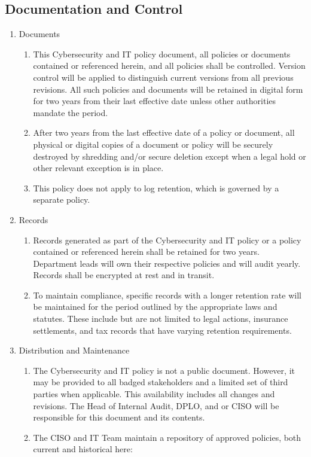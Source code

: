 \documentclass[../main.tex]{subfiles}
\begin{document}
  \subsection{Documentation and Control}
  \begin{enumerate}
    \item Documents
    \begin{enumerate}
        \item This Cybersecurity and IT policy document, all policies or documents contained or referenced herein, and all \CompanyName policies shall be controlled. Version control will
        be applied to distinguish current versions from all previous revisions. All such policies and documents will be retained in digital form for two years from their last effective date
        unless other authorities mandate the period.
        \item After two years from the last effective date of a policy or document, all physical or digital copies of a document or policy will be securely destroyed by shredding and/or secure
        deletion except when a legal hold or other relevant exception is in place.
        \item This policy does not apply to log retention, which is governed by a separate policy.
      \end{enumerate}
  \item{Records}
  \begin{enumerate}
    \item Records generated as part of the Cybersecurity and IT policy or a policy contained or referenced herein shall be retained for two years. Department leads will own their respective
    policies and will audit yearly. Records shall be encrypted at rest and in transit.
    \item To maintain compliance, specific records with a longer retention rate will be maintained for the period outlined by the appropriate laws and statutes. These include but are not
    limited to legal actions, insurance settlements, and tax records that have varying retention requirements.
  \end{enumerate}
  \item{Distribution and Maintenance}
  \begin{enumerate}
    \item The Cybersecurity and IT policy is not a public document. However, it may be provided to all badged stakeholders and a limited set of third parties when applicable.
    This availability includes all changes and revisions. The Head of Internal Audit, DPLO, and or CISO will be responsible for this document and its contents.
    \item The CISO and IT Team maintain a repository of approved policies, both current and historical here: \DocumentationandPolicies
  \end{enumerate}
  \end{enumerate}
\end{document}
